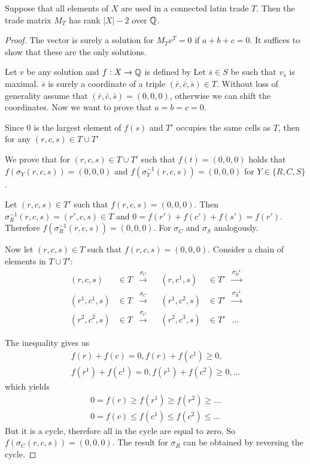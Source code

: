 \begin{lem}
Suppose that all elements of $X$ are used in a connected latin trade $T$. Then the trade matrix $M_T$ has rank $|X|-2$ over $\mathbb Q$.
\end{lem}
\begin{proof}

The vector
is surely a solution for $M_Tv^T = 0$ if $a+b+c=0$. It suffices to show that these are the only solutions.

Let $v$ be any solution and $f:X \rightarrow \mathbb Q$ is defined by
Let $\bar s \in S$ be such that $v_{\bar s}$ is maximal. $\bar  s$ is surely a coordinate of a triple $(\bar r,\bar c,\bar s) \in T$. Without loss of generality assume that $(\bar r,\bar c,\bar s) = (0,0,0)$, otherwise we can shift the coordinates. Now we want to prove that $a = b = c = 0$.

Since $0$ is the largest element of $f(s)$ and $T'$ occupies the same cells as $T$, then for any $(r,c,s) \in T \cup T'$

We prove that for $(r,c,s) \in T\cup T'$ such that $f(t) = (0,0,0)$ holds that $f(\sigma_Y(r,c,s)) = (0,0,0)$ and $f(\sigma_Y^{-1}(r,c,s)) = (0,0,0)$ for $Y \in \{R, C, S\}$.

Let $(r,c,s) \in T'$ such that $f(r,c,s) = (0,0,0)$. Then $\sigma_R^{-1}(r,c,s) = (r',c,s) \in T$ and $0=f(r')+f(c')+f(s')=f(r')$. Therefore $f(\sigma_R^{-1}(r,c,s)) = (0,0,0)$. For $\sigma_C$ and $\sigma_S$ analogously.

Now let $(r,c,s) \in T$ such that $f(r,c,s)=(0,0,0)$. Consider a chain of elements in $T \cup T'$:
\begin{align*}
	(r,c,s) &\in T &\xrightarrow{\sigma_C}& &(r,c^1,s) &\in T' & \xrightarrow{\sigma_R^{-1}} \\
	(r^1,c^1,s) &\in T &\xrightarrow{\sigma_C}& &(r^1,c^2,s) &\in T' & \xrightarrow{\sigma_R^{-1}} \\
	(r^2,c^2,s) &\in T &\xrightarrow{\sigma_C}& &(r^2,c^3,s) &\in T' & \dots
\end{align*}

The inequality gives us
\begin{align*}
	f(r) + f(c) = 0, f(r) + f(c^1) \geq 0, \\
	f(r^1) + f(c^1) = 0, f(r^1) + f(c^2) \geq 0, \dots 
\end{align*}
which yields
\begin{align*}
	0 = f(r) \geq f(r^1) \geq f(r^2) \geq \dots \\
	0 = f(c) \leq f(c^1) \leq f(c^2) \leq \dots
\end{align*}
But it is a cycle, therefore all in the cycle are equal to zero. So $f(\sigma_C(r,c,s)) = (0,0,0)$. The result for $\sigma_R$ can be obtained by reversing the cycle.


\end{proof}
